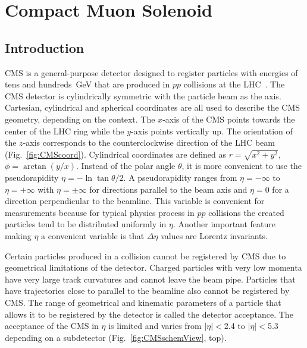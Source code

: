 \section{Compact Muon Solenoid}
\label{sec:Exp_CMS}
\subsection{Introduction}



CMS is a general-purpose detector designed to register particles with energies of tens and hundreds~GeV that are produced in $pp$ collisions at the LHC~\cite{ref_CMS_TDR}. The CMS detector is cylindrically symmetric with the particle beam as the axis. Cartesian, cylindrical and spherical coordinates are all used to describe the CMS geometry, depending on the context. The $x$-axis of the CMS points towards the center of the LHC ring while the $y$-axis points vertically up. The orientation of the $z$-axis corresponds to the counterclockwise direction of the LHC beam (Fig.~\ref{fig:CMScoord}). Cylindrical coordinates are defined as $r=\sqrt{x^2+y^2}$, $\phi=\arctan(y/x)$. Instead of the polar angle $\theta$, it is more convenient to use the pseudorapidity $\eta=-\ln{\tan{\theta/2}}$. A pseudorapidity ranges from $\eta=-\infty$ to $\eta=+\infty$ with $\eta=\pm \infty$ for directions parallel to the beam axis and $\eta=$0 for a direction perpendicular to the beamline. This variable is convenient for measurements because for typical physics process in $pp$ collisions the created particles tend to be distributed uniformly in $\eta$. Another important feature making $\eta$ a convenient variable is that $\Delta \eta$ values are Lorentz invariants.

Certain particles produced in a collision cannot be registered by CMS due to geometrical limitations of the detector. Charged particles with very low momenta have very large track curvatures and cannot leave the beam pipe. Particles that have trajectories close to parallel to the beamline also cannot be registered by CMS. The range of geometrical and kinematic parameters of a particle that allows it to be registered by the detector is called the detector acceptance. The acceptance of the CMS in $\eta$ is limited and varies from $|\eta|<$2.4 to $|\eta|<$5.3 depending on a subdetector (Fig.~\ref{fig:CMSschemView}, top).   

